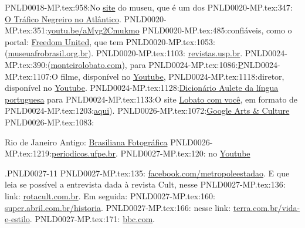{{{{{{PNLD0018-MP.tex:958:No \href{https://www.ushmm.org/}{site} do museu, que é um dos 
PNLD0020-MP.tex:347:    \href{https://www.youtube.com/watch?v=aMyg2Cmukmo}{O Tráfico Negreiro no Atlântico}.
PNLD0020-MP.tex:351:\href{https://youtu.be/aMyg2Cmukmo}{youtu.be/aMyg2Cmukmo}
PNLD0020-MP.tex:485:confiáveis, como o portal: \href{https://www.freedomunited.org/}{Freedom United}, que tem
PNLD0020-MP.tex:1053:(\href{http://www.museuafrobrasil.org.br/}{museuafrobrasil.org.br}).
PNLD0020-MP.tex:1103:  \href{http://www.revistas.usp.br/eav/article/view/9507}{revistas.usp.br}.
PNLD0024-MP.tex:390:(\href{http://www.monteirolobato.com/miscelania/jeca-tatuzinho}{monteirolobato.com}), para
PNLD0024-MP.tex:1086:\href{http://www.monteirolobato.com/linha-do-tempo/1931-1939-a-luta-de-lobato-pelo-petroleo-e-ferro}%
PNLD0024-MP.tex:1107:O filme, disponível no \href{https://www.youtube.com/watch?v=LcdfdfD9_Bs}{Youtube}, 
PNLD0024-MP.tex:1118:diretor, disponível no \href{https://www.youtube.com/watch?v=C9OrDOQWm5o}{Youtube}.
PNLD0024-MP.tex:1128:\href{http://www.aulete.com.br/}{Dicionário Aulete da língua portuguesa} para 
PNLD0024-MP.tex:1133:O site \href{https://lobato.com.vc//}{Lobato com você}, em formato de 
PNLD0024-MP.tex:1203:\href{http://machadodeassis.net/download/numero04/num04artigo02.pdf}{aqui}).
PNLD0026-MP.tex:1072:\href{https://artsandculture.google.com/entity/jean-baptiste-debret/m049vrh}{Google Arts \& Culture}
PNLD0026-MP.tex:1083:\item Rio de Janeiro Antigo: \href{http://brasilianafotografica.bn.br}{Brasiliana Fotográfica}
PNLD0026-MP.tex:1219:\href{https://periodicos.ufpe.br/revistas/EUTOMIA/article/view/1902/1489}{periodicos.ufpe.br}.
PNLD0027-MP.tex:120:	no \href{https://www.youtube.com/watch?v=47NIEsOO6qA}{Youtube}}.{PNLD0027-11}
PNLD0027-MP.tex:135:		\href{https://www.facebook.com/209792265728043/videos/1772581939449060}{facebook.com/metropoleestadao}. E que leia se possível a entrevista dada à revista Cult, nesse 
PNLD0027-MP.tex:136:		link: \href{https://rotacult.com.br/2017/08/dr-luis-marra-fala-sobre-o-livro-cronicas-do-crack/}{rotacult.com.br}. Em seguida:
PNLD0027-MP.tex:160:			\href{https://super.abril.com.br/historia/high-hitler-como-o-uso-de-drogas-mudou-o-desfecho-da-2a-guerra/}{super.abril.com.br/historia}.
PNLD0027-MP.tex:166:			nesse link: \href{https://www.terra.com.br/vida-e-estilo/turismo/internacional/jornal-lista-10-paises-onde-bebida-alcoolica-e-proibida,a1aebf5da7afe310VgnVCM5000009ccceb0aRCRD.html}{terra.com.br/vida-e-estilo}. 
PNLD0027-MP.tex:171:			\href{https://www.bbc.com/portuguese/internacional-50842940}{bbc.com}.
}}}}}
